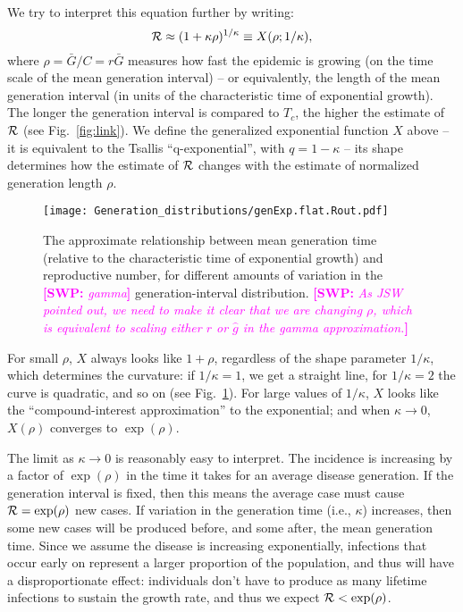\documentclass[12pt,]{article}
\newcommand{\RR}{\ensuremath{{\cal R}}}
\newcommand{\Tc}{\ensuremath{C}}
\newcommand{\fref}[1]{Fig.~\ref{fig:#1}}
\newcommand{\comment}[3]{\textcolor{#1}{\textbf{[#2: }\textit{#3}\textbf{]}}}
\newcommand{\swp}[1]{\comment{magenta}{SWP}{#1}}
\begin{document}
We try to interpret this equation further by writing:
\begin{equation}
	\RR \approx (1 + \kappa \rho)^{1/\kappa} \equiv X(\rho; 1/\kappa),
	\label{eq:genExp}
\end{equation}
where $\rho = \bar G/\Tc = r\bar G$ measures how fast the epidemic is growing (on the time scale of the mean generation interval) -- or equivalently, the length of the mean generation interval (in units of the characteristic time of exponential growth).
The longer the generation interval is compared to $T_c$, the higher the estimate of $\RR$ (see \fref{link}).
We define the generalized exponential function $X$ above -- it is equivalent to the Tsallis ``q-exponential'', with $q=1-\kappa$ \cite{tsallis1994numbers} -- its shape determines how the estimate of $\RR$ changes with the estimate of normalized generation length $\rho$.

\begin{figure}[htbp]
	\centering \texttt{[image: Generation\_distributions/genExp.flat.Rout.pdf]}
	\caption{
		The approximate relationship between mean generation time (relative to
		the characteristic time of exponential growth) and reproductive number,
		for different amounts of variation in the \swp{gamma} generation-interval
		distribution. \swp{As JSW pointed out, we need to make it clear that we are changing $\rho$, which is equivalent to scaling either $r$ or $\hat{g}$ in the gamma approximation.}
	} \label{fig:genExp} 
\end{figure}

For small $\rho$, $X$ always looks like $1+\rho$, regardless of the shape parameter $1/\kappa$, which determines the curvature: if $1/\kappa = 1$, we get a straight line, for $1/\kappa=2$ the curve is quadratic, and so on (see \fref{genExp}).
For large values of $1/\kappa$, $X$ looks like the ``compound-interest approximation'' to the exponential; and when $\kappa \to 0$, $X(\rho)$ converges to $\exp(\rho)$.

The limit as $\kappa\to 0$ is reasonably easy to interpret. The incidence is increasing by a factor of $\exp(\rho)$ in the time it takes for an average disease generation. If the generation interval is fixed, then this means the average case must cause $\RR = \exp(\rho)$ new cases.
If variation in the generation time (i.e., $\kappa$) increases, then some new cases will be produced before, and some after, the mean generation time.
Since we assume the disease is increasing exponentially, infections that occur early on represent a larger proportion of the population, and thus will have a disproportionate effect: individuals don't have to produce as many lifetime infections to sustain the growth rate, and thus we expect  $\RR < \exp(\rho)$.
\end{document}

